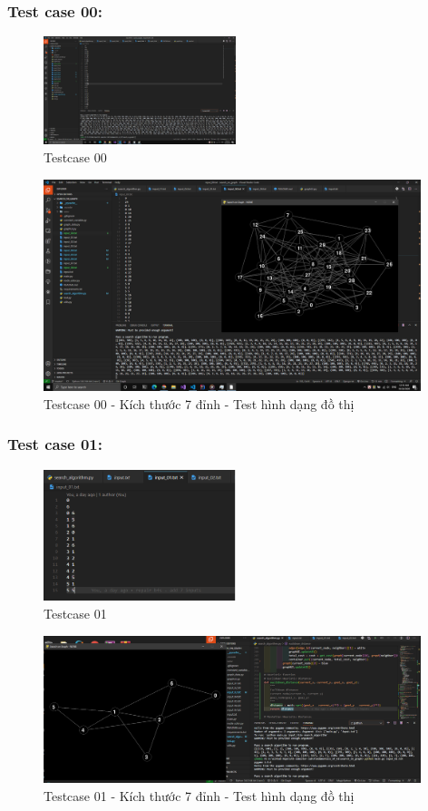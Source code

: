 \documentclass{article}
\begin{document}
\subsubsection{Test case 00:}
\begin{figure}[H]
\centering
\includegraphics[width=0.5\textwidth]{Test_Case_0.png}
\caption{Testcase 00}
\end{figure}
\begin{figure}[H]
\centering
\includegraphics[width=0.98\textwidth]{Test_Case_0_Content.png}
\caption{Testcase 00 - Kích thước 7 đỉnh - Test hình dạng đồ thị}
\end{figure}
\subsubsection{Test case 01:}
\begin{figure}[H]
\centering
\includegraphics[width=0.5\textwidth]{Test_Case_01_Content.png}
\caption{Testcase 01}
\end{figure}
\begin{figure}[H]
\centering
\includegraphics[width=0.98\textwidth]{Test_Case_01.png}
\caption{Testcase 01 - Kích thước 7 đỉnh - Test hình dạng đồ thị}
\end{figure}
\end{document}
